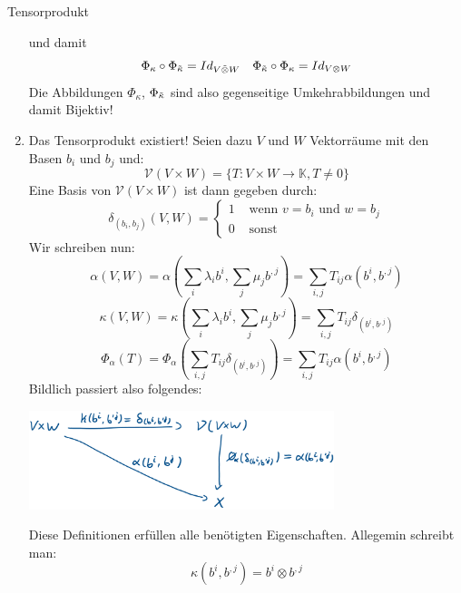 \begin{Def}{Tensorprodukt}
\begin{enumerate}
\begin{center}
\end{center}
und damit $$\Phi_\kappa \circ \Phi_{\Tilde{\kappa}}=Id_{V\Tilde{\otimes}W} \quad \Phi_{\Tilde{\kappa}} \circ \Phi_\kappa  =Id_{V\otimes W}$$
Die Abbildungen $\Phi_\kappa$, $\Phi_{\Tilde{\kappa}}$ sind also gegenseitige Umkehrabbildungen und damit Bijektiv!
\item Das Tensorprodukt existiert! Seien dazu $V$ und $W$ Vektorräume mit den Basen $b_i$ und $b_j$ und:
$$\mathcal{V}(V\times W)=\{ T: V\times W \rightarrow \mathbb{K}, T\neq 0 \}$$
Eine Basis von $\mathcal{V}(V\times W)$ ist dann gegeben durch:
$$\delta_{(b_i, b_j)}(V,W)=\begin{cases}
    1 & \mbox{ wenn $v=b_i$ und $w=b_j$} \\
    0 & \mbox{ sonst}
\end{cases}$$
Wir schreiben nun:
$$\alpha(V,W) = \alpha(\sum_i \lambda_ib^i, \sum_j \mu_jb^{,j})=\sum_{i,j} T_{ij}\alpha(b^i, b^{,j})$$
$$\kappa(V, W)= \kappa(\sum_i \lambda_ib^i, \sum_j \mu_jb^{,j})=\sum_{i,j} T_{ij}\delta_{(b^i, b^{,j})}$$
$$\Phi_\alpha(T)=\Phi_\alpha(\sum_{i,j} T_{ij}\delta_{(b^i, b^{,j})})=\sum_{i,j}T_{ij}\alpha(b^i, b^{,j})$$
Bildlich passiert also folgendes:
\begin{center}
    \includegraphics[width=0.7\textwidth]{Dateien/Tensor3.png}
\end{center}
Diese Definitionen erfüllen alle benötigten Eigenschaften. Allegemin schreibt man:
$$\kappa(b^i, b^{,j})=b^i\otimes b^{,j}$$
\end{enumerate}
\end{Def}

